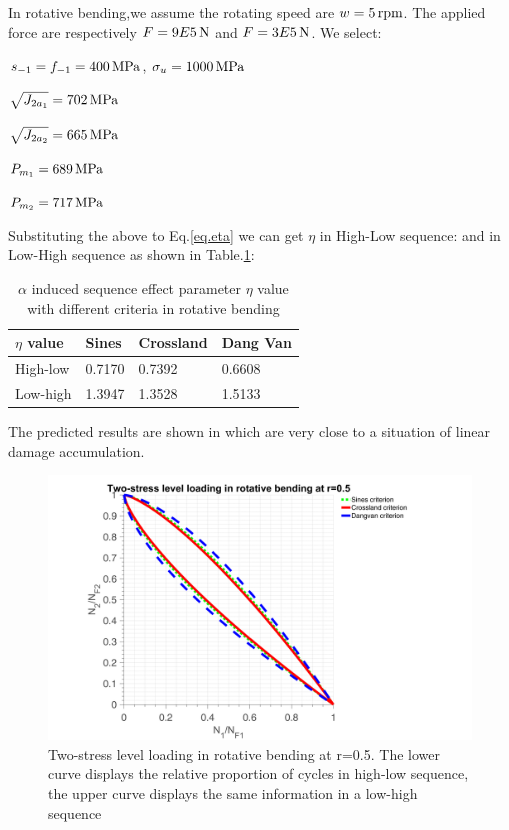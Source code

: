 In rotative bending,we assume the rotating speed are $w=5\, \textnormal{rpm}$. The applied force are respectively $F=9E5  \, \textnormal{N}$ and $F=3E5  \, \textnormal{N}$. We select:

$s_{-1}=f_{-1}=400 \, \textnormal{MPa}$, $\sigma_{u}=1000\, \textnormal{MPa}$

\vspace{6pt}
$\sqrt{J_{2a_1}}=702\, \textnormal{MPa}$

\vspace{6pt}
$\sqrt{J_{2a_2}}=665\, \textnormal{MPa}$

\vspace{6pt}
$P_{m_1}=689\, \textnormal{MPa}$

\vspace{6pt}
$P_{m_2}=717\, \textnormal{MPa}$

Substituting the above to Eq.\eqref{eq.eta} we can get $\eta$ in High-Low sequence:
and in Low-High sequence as shown in Table.\ref{tab.etarb}:
\begin{table}[!h]
	\centering
	\begin{tabular}{llll}
		\hline
		$\eta$ value   & Sines  & Crossland & Dang Van \\ \hline
		High-low & 0.7170 &  0.7392 &   0.6608   \\
		Low-high & 1.3947 & 1.3528   &  1.5133  \\ \hline
	\end{tabular}
	\caption{$\alpha$ induced sequence effect parameter $\eta$ value with different criteria in rotative bending}
	\label{tab.etarb}
\end{table}

The predicted results are shown in  which are very close to a situation of linear damage accumulation.

\begin{figure}[!h]
	\centering
	\includegraphics[width=\textwidth]{figures//2stressRB.png} 
	\caption{Two-stress level loading in rotative bending at r=0.5. The lower curve displays the relative proportion of cycles in high-low sequence, the upper curve displays the same information in a low-high sequence}
	\label{2stressRB}
\end{figure}
\clearpage

